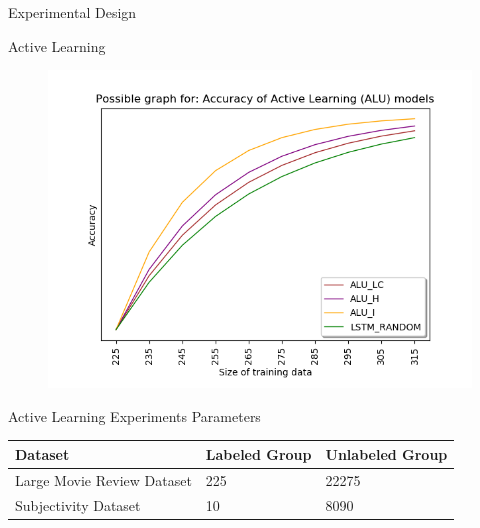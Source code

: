\documentclass[10pt]{beamer}
\begin{document}
\begin{frame}[fragile]{Experimental Design}
    
\end{frame}

\begin{frame}[fragile]{Active Learning}
    \begin{figure}[htp]
        \centering
        \includegraphics[scale=0.6]{images/active_learning_comp_graph.png}
    \end{figure}
\end{frame}

\begin{frame}[fragile]{Active Learning Experiments Parameters}
\begin{table}[]
\centering
\begin{tabular}{lll}
\toprule
Dataset & Labeled Group & Unlabeled Group\\
\midrule
\rowcolor{black!20}  Large Movie Review Dataset & 225 & 22275\\
Subjectivity Dataset & 10 & 8090\\
\bottomrule
\end{tabular}
\end{table}
\end{frame}
\end{document}
